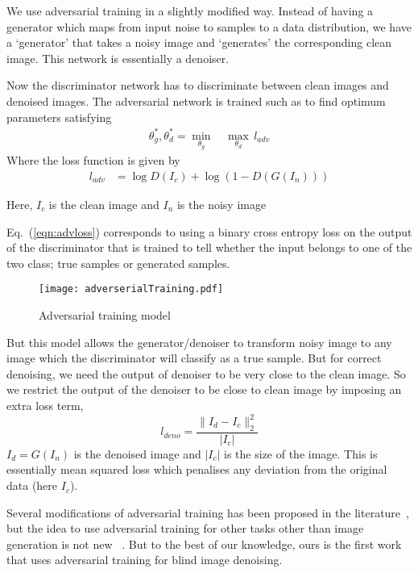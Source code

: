 \documentclass[10pt,twocolumn,letterpaper]{proc}
\begin{document}
We use adversarial training in a slightly modified way. Instead of having a generator which maps from input noise to samples to a data distribution, we have a `generator' that takes a noisy image and `generates' the corresponding clean image. This network is essentially a denoiser.

Now the discriminator network has to discriminate between clean images and denoised images. The adversarial network is trained such as to find optimum parameters satisfying
\begin{align}
    \theta^*_g,\theta^*_d = \min_{\theta_g}&\,\max_{\theta_d}\,l_{adv}
    \label{eqn:advloss}
\end{align}
Where the loss function is given by 
\begin{align}
     l_{adv}&=\log D(I_c) + \log(1-D(G(I_n)))
\end{align}

Here, $I_c$ is the clean image and $I_n$ is the noisy image

Eq.~(\ref{eqn:advloss}) corresponds to using a binary cross entropy loss on the output of the discriminator that is trained to tell whether the input belongs to one of the two class; true samples or generated samples.

\begin{figure}[htbp]
    \centering
    \texttt{[image: adverserialTraining.pdf]}
    \caption{Adversarial training model}
    \label{fig:adversarial}
\end{figure}

But this model allows the generator/denoiser to transform noisy image to any image which the discriminator will classify as a true sample. But for correct denoising, we need the output of denoiser to be very close to the clean image. So we restrict the output of the denoiser to be close to clean image by imposing an extra loss term,
\begin{equation}
    l_{deno} = \frac{\|I_d-I_c\|_2^2}{|I_c|}
\end{equation}
$I_d = G(I_n)$ is the denoised image and $|I_c|$ is the size of the image. This is essentially mean squared loss which penalises  any deviation from the original data (here $I_c$).





Several modifications of adversarial training has been proposed in the literature~\cite{radford2015unsupervised,imporvedGANTraining}, but the idea to use adversarial training for other tasks other than image generation is  not new
~\cite{denton2015deep,mathieu2015deep,ledig2016photo}. But to the best of our knowledge, ours is the first work that uses adversarial training for blind image denoising.
\end{document}
